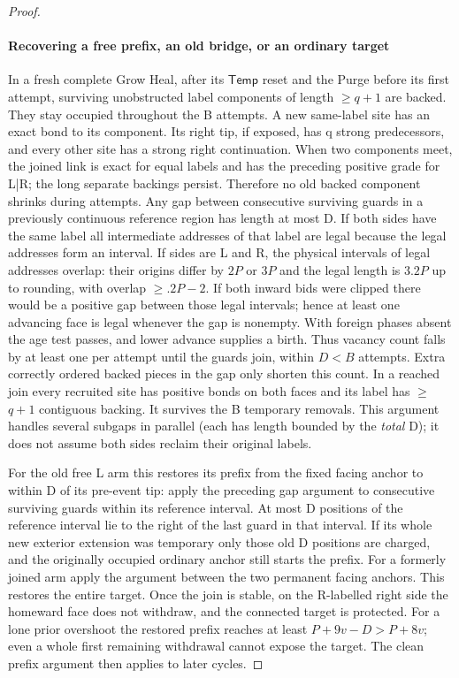 \begin{proof}
\paragraph{Recovering a free prefix, an old bridge, or an ordinary target}

In a fresh complete Grow Heal, after its \(\mathsf{Temp}\) reset and the Purge before its first attempt, surviving unobstructed label components of length \(\ge\)\(q+1\) are backed. They stay occupied throughout the B attempts. A new same-label site has an exact bond to its component. Its right tip, if exposed, has q strong predecessors, and every other site has a strong right continuation. When two components meet, the joined link is exact for equal labels and has the preceding positive grade for L|R; the long separate backings persist. Therefore no old backed component shrinks during attempts. Any gap between consecutive surviving guards in a previously continuous reference region has length at most D. If both sides have the same label all intermediate addresses of that label are legal because the legal addresses form an interval. If sides are L and R, the physical intervals of legal addresses overlap: their origins differ by \(2P\) or \(3P\) and the legal length is \(3.2P\) up to rounding, with overlap \(\ge\)\(.2P- 2\). If both inward bids were clipped there would be a positive gap between those legal intervals; hence at least one advancing face is legal whenever the gap is nonempty. With foreign phases absent the age test passes, and lower advance supplies a birth. Thus vacancy count falls by at least one per attempt until the guards join, within \(D<B\) attempts. Extra correctly ordered backed pieces in the gap only shorten this count. In a reached join every recruited site has positive bonds on both faces and its label has \(\ge\)\(q+1\) contiguous backing. It survives the B temporary removals. This argument handles several subgaps in parallel (each has length bounded by the \emph{total} D); it does not assume both sides reclaim their original labels.

For the old free L arm this restores its prefix from the fixed facing anchor to within D of its pre-event tip: apply the preceding gap argument to consecutive surviving guards within its reference interval. At most D positions of the reference interval lie to the right of the last guard in that interval. If its whole new exterior extension was temporary only those old D positions are charged, and the originally occupied ordinary anchor still starts the prefix. For a formerly joined arm apply the argument between the two permanent facing anchors. This restores the entire target. Once the join is stable, on the R-labelled right side the homeward face does not withdraw, and the connected target is protected. For a lone prior overshoot the restored prefix reaches at least \(P+9v- D>P+8v\); even a whole first remaining withdrawal cannot expose the target. The clean prefix argument then applies to later cycles.


\end{proof}
